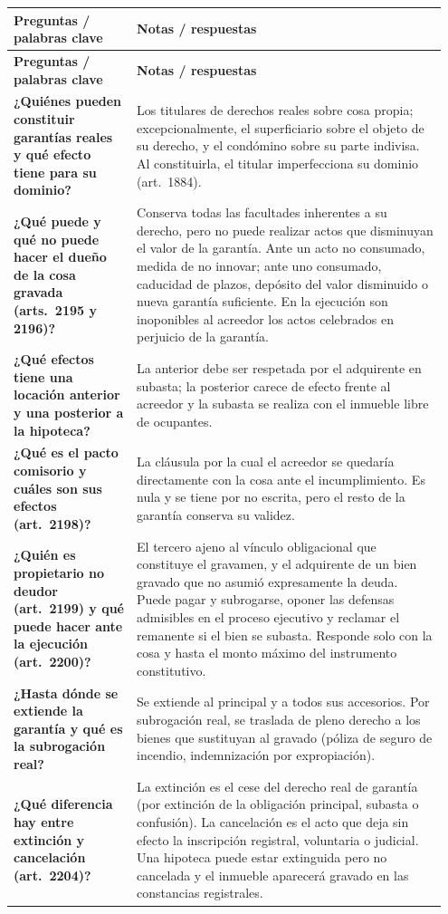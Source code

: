 \documentclass[12pt,oneside]{book}
\makeatletter
\newenvironment{cornell}{%
    \par\vspace{0.5em}
    \noindent
    \begin{longtable}{@{}>{\raggedright\arraybackslash}p{0.27\linewidth}
                         >{\raggedright\arraybackslash}p{0.68\linewidth}@{}}
    \toprule
    \textbf{Preguntas / palabras clave} & \textbf{Notas / respuestas} \\
    \midrule
    \endfirsthead
    \toprule
    \textbf{Preguntas / palabras clave} & \textbf{Notas / respuestas} \\
    \midrule
    \endhead
}{%
    \bottomrule
    \end{longtable}
}
\makeatother
\begin{document}
\begin{cornell}
\textbf{¿Quiénes pueden constituir garantías reales y qué efecto tiene para su dominio?} &
Los titulares de derechos reales sobre cosa propia; excepcionalmente, el superficiario sobre el objeto de su derecho, y el condómino sobre su parte indivisa. Al constituirla, el titular imperfecciona su dominio (art.~1884). \\

\textbf{¿Qué puede y qué no puede hacer el dueño de la cosa gravada (arts.~2195 y 2196)?} &
Conserva todas las facultades inherentes a su derecho, pero no puede realizar actos que disminuyan el valor de la garantía. Ante un acto no consumado, medida de no innovar; ante uno consumado, caducidad de plazos, depósito del valor disminuido o nueva garantía suficiente. En la ejecución son inoponibles al acreedor los actos celebrados en perjuicio de la garantía. \\

\textbf{¿Qué efectos tiene una locación anterior y una posterior a la hipoteca?} &
La anterior debe ser respetada por el adquirente en subasta; la posterior carece de efecto frente al acreedor y la subasta se realiza con el inmueble libre de ocupantes. \\

\textbf{¿Qué es el pacto comisorio y cuáles son sus efectos (art.~2198)?} &
La cláusula por la cual el acreedor se quedaría directamente con la cosa ante el incumplimiento. Es nula y se tiene por no escrita, pero el resto de la garantía conserva su validez. \\

\textbf{¿Quién es propietario no deudor (art.~2199) y qué puede hacer ante la ejecución (art.~2200)?} &
El tercero ajeno al vínculo obligacional que constituye el gravamen, y el adquirente de un bien gravado que no asumió expresamente la deuda. Puede pagar y subrogarse, oponer las defensas admisibles en el proceso ejecutivo y reclamar el remanente si el bien se subasta. Responde solo con la cosa y hasta el monto máximo del instrumento constitutivo. \\

\textbf{¿Hasta dónde se extiende la garantía y qué es la subrogación real?} &
Se extiende al principal y a todos sus accesorios. Por subrogación real, se traslada de pleno derecho a los bienes que sustituyan al gravado (póliza de seguro de incendio, indemnización por expropiación). \\

\textbf{¿Qué diferencia hay entre extinción y cancelación (art.~2204)?} &
La extinción es el cese del derecho real de garantía (por extinción de la obligación principal, subasta o confusión). La cancelación es el acto que deja sin efecto la inscripción registral, voluntaria o judicial. Una hipoteca puede estar extinguida pero no cancelada y el inmueble aparecerá gravado en las constancias registrales. \\


\end{cornell}
\end{document}
